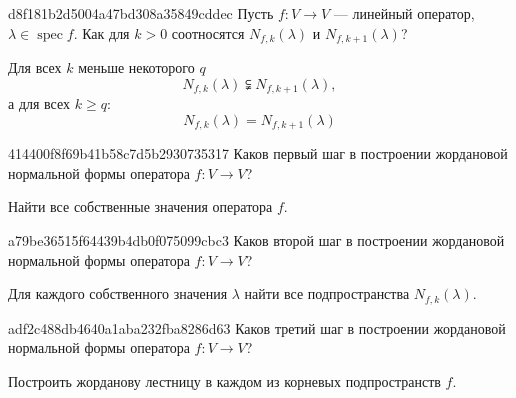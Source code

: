 
\begin{note}{d8f181b2d5004a47bd308a35849cddec}
    Пусть \( f : V \to V \) --- линейный оператор, \( \lambda \in \operatorname{spec} f \).
    Как для \( k > 0 \) соотносятся \( N_{f,k} (\lambda) \) и \( N_{f, k+1} (\lambda) \)?

    \begin{cloze}{1}
        Для всех \( k \) меньше некоторого \( q \)
        \[
            N_{f, k} (\lambda) \subsetneqq N_{f, k+1} (\lambda),
        \]
        а для всех \( k \geqslant q \):
        \[
            N_{f, k} (\lambda) = N_{f, k+1} (\lambda)
        \]
    \end{cloze}
\end{note}

\begin{note}{414400f8f69b41b58c7d5b2930735317}
    Каков первый шаг в построении жордановой нормальной формы оператора \( f : V \to V \)?

    \begin{cloze}{1}
        Найти все собственные значения оператора \( f \).
    \end{cloze}
\end{note}

\begin{note}{a79be36515f64439b4db0f075099cbc3}
    Каков второй шаг в построении жордановой нормальной формы оператора \( f : V \to V \)?

    \begin{cloze}{1}
        Для каждого собственного значения \( \lambda \) найти все подпространства \( N_{f, k} (\lambda) \).
    \end{cloze}
\end{note}

\begin{note}{adf2c488db4640a1aba232fba8286d63}
    Каков третий шаг в построении жордановой нормальной формы оператора \( f : V \to V \)?

    \begin{cloze}{1}
        Построить жорданову лестницу в каждом из корневых подпространств \( f \).
    \end{cloze}
\end{note}

